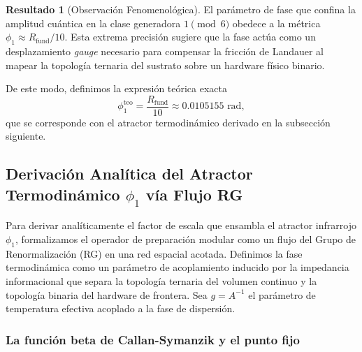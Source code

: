 \documentclass[12pt,a4paper]{article}
\theoremstyle{plain}
\theoremstyle{definition}
\newtheorem{resultado}[teorema]{Resultado}
\theoremstyle{remark}
\begin{document}
\begin{resultado}[Observación Fenomenológica]
El parámetro de fase que confina la amplitud cuántica en la clase generadora $1 \pmod 6$ obedece a la métrica $\phi_1 \approx R_{\text{fund}}/10$. Esta extrema precisión sugiere que la fase actúa como un desplazamiento \textit{gauge} necesario para compensar la fricción de Landauer al mapear la topología ternaria del sustrato sobre un hardware físico binario.
\end{resultado}

De este modo, definimos la expresión teórica exacta
\begin{equation}
\phi_1^{\text{teo}} = \frac{R_{\text{fund}}}{10} \approx 0.0105155 \text{ rad},
\label{eq:phi1_teo}
\end{equation}
que se corresponde con el atractor termodinámico derivado en la subsección siguiente.

\subsection{Derivación Analítica del Atractor Termodinámico $\phi_1$ vía Flujo RG}
\label{sec:derivacion_phi1}

Para derivar analíticamente el factor de escala que ensambla el atractor infrarrojo $\phi_1$, formalizamos el operador de preparación modular como un flujo del Grupo de Renormalización (RG) en una red espacial acotada. Definimos la fase termodinámica como un parámetro de acoplamiento inducido por la impedancia informacional que separa la topología ternaria del volumen continuo y la topología binaria del hardware de frontera. Sea $g = A^{-1}$ el parámetro de temperatura efectiva acoplado a la fase de dispersión. 

\subsubsection{La función beta de Callan-Symanzik y el punto fijo}
\end{document}
